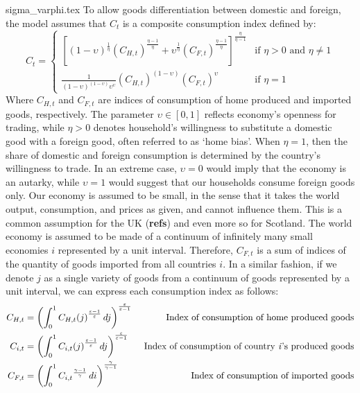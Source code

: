 {sigma_varphi.tex}
To allow goods differentiation between domestic and foreign, the model assumes that $C_t$ is a composite consumption index defined by:
\begin{equation}
    C_t = 
    \begin{cases}
        \left[ (1-\upsilon)^\frac{1}{\eta} (C_{H,t})^{\frac{\eta-1}{\eta}} + \upsilon^{\frac{1}{\eta}}(C_{F,t})^{\frac{\eta-1}{\eta}}\right]^{\frac{\eta}{\eta-1}} & \text{if $\eta > 0$ and $\eta \ne 1$} \\
        \frac{1}{(1-\upsilon)^{(1-\upsilon)}\upsilon^\upsilon}(C_{H,t})^{(1-\upsilon)}(C_{F,t})^\upsilon & \text{if $\eta = 1$}
    \end{cases}
\end{equation}
Where $C_{H,t}$ and $C_{F,t}$ are indices of consumption of home produced and imported goods, respectively. The parameter $\upsilon \in [0,1]$ reflects economy's openness for trading, while $\eta > 0$ denotes household's willingness to substitute a domestic good with a foreign good, often referred to as `home bias'. When $\eta = 1$, then the share of domestic and foreign consumption is determined by the country's willingness to trade. In an extreme case, $\upsilon = 0$ would imply that the economy is an autarky, while $\upsilon = 1$ would suggest that our households consume foreign goods only. Our economy is assumed to be small, in the sense that it takes the world output, consumption, and prices as given, and cannot influence them. This is a common assumption for the UK (\textbf{refs}) and even more so for Scotland. The world economy is assumed to be made of a continuum of infinitely many small economies $i$ represented by a unit interval. Therefore, $C_{F,t}$ is a sum of indices of the quantity of goods imported from all countries $i$. In a similar fashion, if we denote $j$ as a single variety of goods from a continuum of goods represented by a unit interval, we can express each consumption index as follows: 
\begin{align*}
    C_{H,t} & = \left( \int_{0}^{1} {C_{H,t}(j)}^{\frac{\varepsilon-1}{\varepsilon}} \,dj  \right)^\frac{\varepsilon}{\varepsilon-1} & \text{ Index of consumption of home produced goods}                 \\
    C_{i,t} & = \left( \int_{0}^{1} {C_{i,t}(j)}^{\frac{\varepsilon-1}{\varepsilon}} \,dj  \right)^\frac{\varepsilon}{\varepsilon-1} & \text{ Index of consumption of country \textit{i}'s produced goods} \\
    C_{F,t} & = \left( \int_{0}^{1} {C_{i,t}}^{\frac{\gamma-1}{\gamma}} \,di  \right)^{\frac{\gamma}{\gamma-1}}                      & \text{ Index of consumption of imported goods}
\end{align*}
